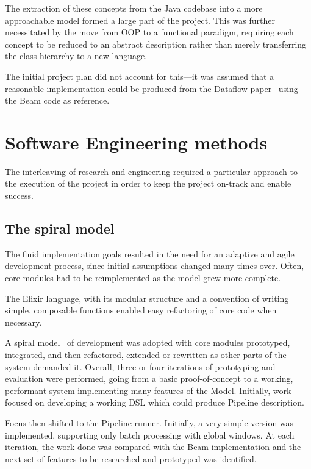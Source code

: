 The extraction of these concepts from the Java codebase into a more approachable model formed a large part of the project.
This was further necessitated by the move from OOP to a functional paradigm, requiring each concept to be reduced to an abstract description rather than merely transferring the class hierarchy to a new language.

The initial project plan did not account for this---it was assumed that a reasonable implementation could be produced from the Dataflow paper~\cite{Akidau:2015} using the Beam code as reference.

\section{Software Engineering methods}\label{sec:prep:softeng}

The interleaving of research and engineering required a particular approach to the execution of the project in order to keep the project on-track and enable success.

\subsection{The spiral model}\label{sec:prep:softeng:spiral}

The fluid implementation goals resulted in the need for an adaptive and agile development process, since initial assumptions changed many times over.
Often, core modules had to be re\"implemented as the model grew more complete.

The Elixir language, with its modular structure and a convention of writing simple, composable functions enabled easy refactoring of core code when necessary.

A spiral model~\cite{Boehm:1986} of development was adopted with core modules prototyped, integrated, and then refactored, extended or rewritten as other parts of the system demanded it.
Overall, three or four iterations of prototyping and evaluation were performed, going from a basic proof-of-concept to a working, performant system implementing many features of the Model.
Initially, work focused on developing a working DSL which could produce Pipeline description.

Focus then shifted to the Pipeline runner.
Initially, a very simple version was implemented, supporting only batch processing with global windows.
At each iteration, the work done was compared with the Beam implementation and the next set of features to be researched and prototyped was identified.

